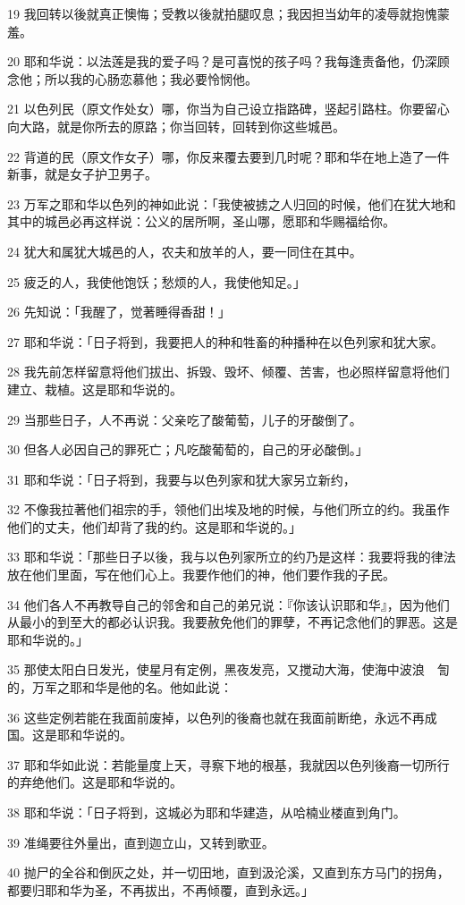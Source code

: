 \par 19 我回转以後就真正懊悔；受教以後就拍腿叹息；我因担当幼年的凌辱就抱愧蒙羞。
\par 20 耶和华说：以法莲是我的爱子吗？是可喜悦的孩子吗？我每逢责备他，仍深顾念他；所以我的心肠恋慕他；我必要怜悯他。
\par 21 以色列民（原文作处女）哪，你当为自己设立指路碑，竖起引路柱。你要留心向大路，就是你所去的原路；你当回转，回转到你这些城邑。
\par 22 背道的民（原文作女子）哪，你反来覆去要到几时呢？耶和华在地上造了一件新事，就是女子护卫男子。
\par 23 万军之耶和华以色列的神如此说：「我使被掳之人归回的时候，他们在犹大地和其中的城邑必再这样说：公义的居所啊，圣山哪，愿耶和华赐福给你。
\par 24 犹大和属犹大城邑的人，农夫和放羊的人，要一同住在其中。
\par 25 疲乏的人，我使他饱饫；愁烦的人，我使他知足。」
\par 26 先知说：「我醒了，觉著睡得香甜！」
\par 27 耶和华说：「日子将到，我要把人的种和牲畜的种播种在以色列家和犹大家。
\par 28 我先前怎样留意将他们拔出、拆毁、毁坏、倾覆、苦害，也必照样留意将他们建立、栽植。这是耶和华说的。
\par 29 当那些日子，人不再说：父亲吃了酸葡萄，儿子的牙酸倒了。
\par 30 但各人必因自己的罪死亡；凡吃酸葡萄的，自己的牙必酸倒。」
\par 31 耶和华说：「日子将到，我要与以色列家和犹大家另立新约，
\par 32 不像我拉著他们祖宗的手，领他们出埃及地的时候，与他们所立的约。我虽作他们的丈夫，他们却背了我的约。这是耶和华说的。」
\par 33 耶和华说：「那些日子以後，我与以色列家所立的约乃是这样：我要将我的律法放在他们里面，写在他们心上。我要作他们的神，他们要作我的子民。
\par 34 他们各人不再教导自己的邻舍和自己的弟兄说：『你该认识耶和华』，因为他们从最小的到至大的都必认识我。我要赦免他们的罪孽，不再记念他们的罪恶。这是耶和华说的。」
\par 35 那使太阳白日发光，使星月有定例，黑夜发亮，又搅动大海，使海中波浪　訇的，万军之耶和华是他的名。他如此说：
\par 36 这些定例若能在我面前废掉，以色列的後裔也就在我面前断绝，永远不再成国。这是耶和华说的。
\par 37 耶和华如此说：若能量度上天，寻察下地的根基，我就因以色列後裔一切所行的弃绝他们。这是耶和华说的。
\par 38 耶和华说：「日子将到，这城必为耶和华建造，从哈楠业楼直到角门。
\par 39 准绳要往外量出，直到迦立山，又转到歌亚。
\par 40 抛尸的全谷和倒灰之处，并一切田地，直到汲沦溪，又直到东方马门的拐角，都要归耶和华为圣，不再拔出，不再倾覆，直到永远。」


